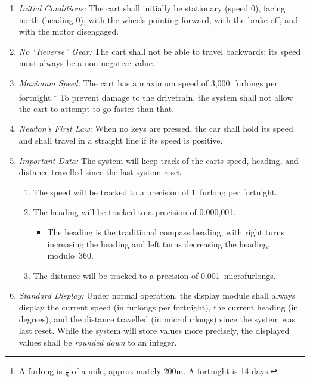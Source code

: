 \begin{enumerate}
    \item \textit{Initial Conditions:} The cart shall initially be stationary (speed 0), facing north (heading 0\textdegree), with the wheels pointing forward, with the brake off, and with the motor disengaged.
    \item \textit{No ``Reverse'' Gear:} The cart shall not be able to travel backwards: its speed must always be a non-negative value.
    \item \textit{Maximum Speed:} The cart has a maximum speed of 3,000~furlongs per fortnight.\footnote{
            A furlong is $\frac{1}{8}$ of a mile, approximately 200m. A fortnight is 14 days.
        }
        To prevent damage to the drivetrain, the system shall not allow the cart to attempt to go faster than that.
    \item \textit{Newton's First Law:} When no keys are pressed, the car shall hold its speed and shall travel in a straight line if its speed is positive.
    \item \label{spec:importantData} \textit{Important Data:} The system will keep track of the carts speed, heading, and distance travelled since the last system reset.
        \begin{enumerate}
            \item The speed will be tracked to a precision of 1~furlong per fortnight.
            \item The heading will be tracked to a precision of 0.000,001\textdegree.
                \begin{itemize}
                    \item The heading is the traditional compass heading, with right turns increasing the heading and left turns decreasing the heading, modulo~360\textdegree.
                \end{itemize}
            \item The distance will be tracked to a precision of 0.001~microfurlongs.
        \end{enumerate}
    \item \label{spec:standardDisplay} \textit{Standard Display:} Under normal operation, the display module shall always display the current speed (in furlongs per fortnight), the current heading (in degrees), and the distance travelled (in microfurlongs) since the system was last reset.
        While the system will store values more precisely, the displayed values shall be \textit{rounded down} to an integer.

\end{enumerate}
